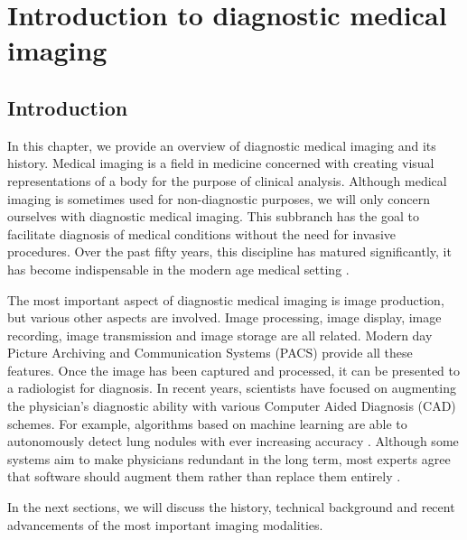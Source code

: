 \chapter{Introduction to diagnostic medical imaging}\label{chap:imaging}

\section{Introduction}
In this chapter, we provide an overview of diagnostic medical imaging and its
history. Medical imaging is a field in medicine concerned with creating visual
representations of a body for the purpose of clinical analysis. Although medical
imaging is sometimes used for non-diagnostic purposes, we will only concern
ourselves with diagnostic medical imaging. This subbranch has the goal to
facilitate diagnosis of medical conditions without the need for invasive
procedures. Over the past fifty years, this discipline has matured
significantly, it has become indispensable in the modern age medical setting
\cite{review}.

The most important aspect of diagnostic medical imaging is image production, but
various other aspects are involved. Image processing, image display, image
recording, image transmission and image storage are all related. Modern day
Picture Archiving and Communication Systems (PACS) provide all these features.
Once the image has been captured and processed, it can be presented to a
radiologist for diagnosis. In recent years, scientists have focused on
augmenting the physician's diagnostic ability with various Computer Aided
Diagnosis (CAD) schemes. For example, algorithms based on machine learning are
able to autonomously detect lung nodules with ever increasing accuracy
\cite{ginneken}. Although some systems aim to make physicians redundant in the
long term, most experts agree that software should augment them rather than
replace them entirely \cite{cadhistory}.

In the next sections, we will discuss the history, technical background and
recent advancements of the most important imaging modalities.









